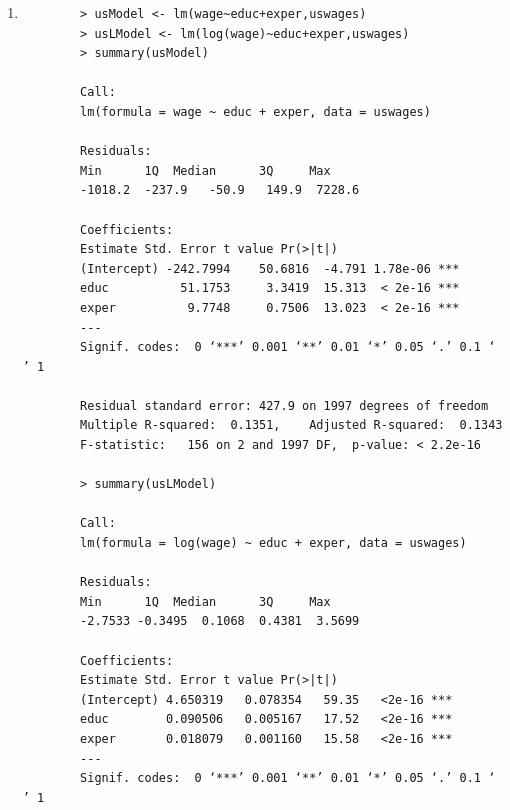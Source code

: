 \documentclass[11pt]{article}
\begin{document}
\begin{enumerate}
\begin{enumerate}
	\item 
	\begin{verbatim}
		> usModel <- lm(wage~educ+exper,uswages)
		> usLModel <- lm(log(wage)~educ+exper,uswages)
		> summary(usModel)
		
		Call:
		lm(formula = wage ~ educ + exper, data = uswages)
		
		Residuals:
		Min      1Q  Median      3Q     Max 
		-1018.2  -237.9   -50.9   149.9  7228.6 
		
		Coefficients:
		Estimate Std. Error t value Pr(>|t|)    
		(Intercept) -242.7994    50.6816  -4.791 1.78e-06 ***
		educ          51.1753     3.3419  15.313  < 2e-16 ***
		exper          9.7748     0.7506  13.023  < 2e-16 ***
		---
		Signif. codes:  0 ‘***’ 0.001 ‘**’ 0.01 ‘*’ 0.05 ‘.’ 0.1 ‘ ’ 1
		
		Residual standard error: 427.9 on 1997 degrees of freedom
		Multiple R-squared:  0.1351,	Adjusted R-squared:  0.1343 
		F-statistic:   156 on 2 and 1997 DF,  p-value: < 2.2e-16
		
		> summary(usLModel)
		
		Call:
		lm(formula = log(wage) ~ educ + exper, data = uswages)
		
		Residuals:
		Min      1Q  Median      3Q     Max 
		-2.7533 -0.3495  0.1068  0.4381  3.5699 
		
		Coefficients:
		Estimate Std. Error t value Pr(>|t|)    
		(Intercept) 4.650319   0.078354   59.35   <2e-16 ***
		educ        0.090506   0.005167   17.52   <2e-16 ***
		exper       0.018079   0.001160   15.58   <2e-16 ***
		---
		Signif. codes:  0 ‘***’ 0.001 ‘**’ 0.01 ‘*’ 0.05 ‘.’ 0.1 ‘ ’ 1
		

\end{verbatim}
\end{enumerate}
\end{enumerate}
\end{document}
